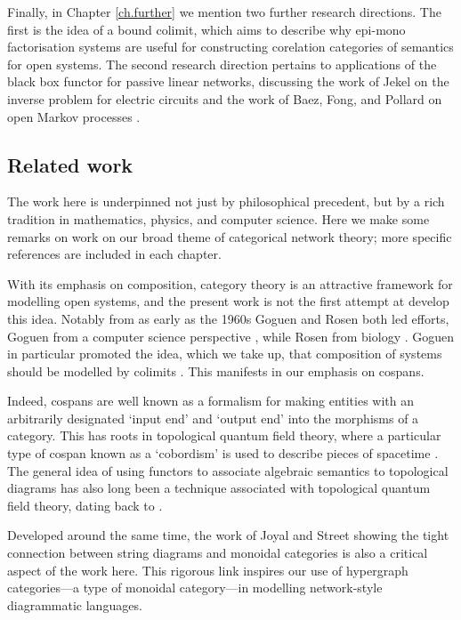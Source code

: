Finally, in Chapter \ref{ch.further} we mention two further research directions.
The first is the idea of a bound colimit, which aims to describe why epi-mono
factorisation systems are useful for constructing corelation categories of
semantics for open systems. The second research direction pertains to
applications of the black box functor for passive linear networks, discussing
the work of Jekel on the inverse problem for electric circuits \cite{Jek} and
the work of Baez, Fong, and Pollard on open Markov processes \cite{BFP,
Pol16}.

\subsection*{Related work}

The work here is underpinned not just by philosophical precedent, but by a rich
tradition in mathematics, physics, and computer science. Here we make some
remarks on work on our broad theme of categorical network theory; more specific
references are included in each chapter. 

With its emphasis on composition, category theory is an attractive framework for
modelling open systems, and the present work is not the first attempt at develop
this idea. Notably from as early as the 1960s Goguen and Rosen both led efforts,
Goguen from a computer science perspective \cite{Go}, while Rosen from
biology \cite{Ros12}. Goguen in particular promoted the idea, which we take up,
that composition of systems should be modelled by colimits \cite{Gog91}. This
manifests in our emphasis on cospans.

Indeed, cospans are well known as a formalism for making entities with an
arbitrarily designated `input end' and `output end' into the morphisms of a
category. This has roots in topological quantum field theory, where a particular
type of cospan known as a `cobordism' is used to describe pieces of spacetime
\cite{BL,BaezStay}. The general idea of using functors to associate algebraic
semantics to topological diagrams has also long been a technique associated with
topological quantum field theory, dating back to \cite{At}.  

Developed around the same time, the work of Joyal and Street showing the tight
connection between string diagrams and monoidal categories \cite{JS91,JS93} is
also a critical aspect of the work here. This rigorous link inspires our use of
hypergraph categories---a type of monoidal category---in modelling network-style
diagrammatic languages.

